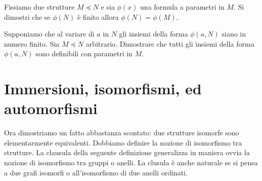 \begin{exercise}
Fissiamo due strutture $M\preceq N$ e sia $\phi(x)$ una formula a parametri in $M$. Si dimostri che se $\phi(N)$ \`e finito allora $\phi(N)=\phi(M)$.\QED
\end{exercise}

\begin{exercise}
Supponiamo che al variare di $a$ in $N$ gli insiemi della forma $\phi(a,N)$ siano in numero finito. Sia $M\preceq N$ arbitrario. Dimostrare che tutti gli insiemi della forma $\phi(a,N)$ sono definibili con parametri in $M$.\QED
\end{exercise}
















\section{Immersioni, isomorfismi, ed automorfismi}


\def\ceq#1#2#3{\hspace*{8ex}\llap{#1}\parbox{5ex}{\hfil#2}\rlap{#3,}\hspace{11ex}}



Ora dimostriamo un fatto abbastanza scontato: due strutture isomorfe sono elementarmente equivalenti. Dobbiamo definire la nozione di isomorfismo tra strutture. La clausula  della seguente definizione generalizza in maniera ovvia la nozione di isomorfismo tra gruppi o anelli. La clusula  \`e anche naturale se si pensa a due grafi isomorfi o all'isomorfismo di due anelli ordinati.

